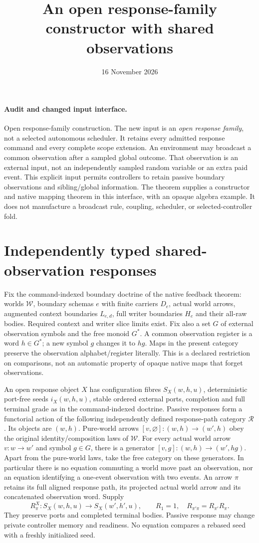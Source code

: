 \documentclass[11pt]{article}
\title{An open response-family constructor with shared observations}
\date{16 November 2026}
\begin{document}
\maketitle
\paragraph{Audit and changed input interface.}
Open response-family construction. The new input is an \emph{open response family}, not a selected autonomous scheduler. It retains every admitted response command and every complete scope extension. An environment may broadcast a common observation after a sampled global outcome. That observation is an external input, not an independently sampled random variable or an extra paid event. This explicit input permits controllers to retain passive boundary observations and sibling/global information. The theorem supplies a constructor and native mapping theorem in this interface, with an opaque algebra example. It does not manufacture a broadcast rule, coupling, scheduler, or selected-controller fold.

\section{Independently typed shared-observation responses}
Fix the command-indexed boundary doctrine of the native feedback theorem: worlds $\mathcal W$, boundary schemas $e$ with finite carriers $D_e$, actual world arrows, augmented context boundaries $L_{e,d}$, full writer boundaries $H_e$ and their all-raw bodies. Required context and writer slice limits exist. Fix also a set $G$ of external observation symbols and the free monoid $G^*$. A common observation register is a word $h\in G^*$; a new symbol $g$ changes it to $hg$. Maps in the present category preserve the observation alphabet/register literally. This is a declared restriction on comparisons, not an automatic property of opaque native maps that forget observations.

An open response object $X$ has configuration fibres $S_X(w,h,u)$, deterministic port-free seeds $i_X(w,h,u)$, stable ordered external ports, completion and full terminal grade as in the command-indexed doctrine. Passive responses form a functorial action of the following independently defined response-path category $\mathcal R$. Its objects are $(w,h)$. Pure-world arrows $[v,\varnothing]:(w,h)\to(w',h)$ obey the original identity/composition laws of $\mathcal W$. For every actual world arrow $v:w\to w'$ and symbol $g\in G$, there is a generator $[v,g]:(w,h)\to(w',hg)$. Apart from the pure-world laws, take the free category on these generators. In particular there is no equation commuting a world move past an observation, nor an equation identifying a one-event observation with two events. An arrow $\pi$ retains its full aligned response path, its projected actual world arrow and its concatenated observation word. Supply
\[
 R^X_\pi:S_X(w,h,u)\longrightarrow S_X(w',h',u),\qquad
 R_1=1,\quad R_{\pi'\pi}=R_{\pi'}R_\pi.               \tag{1}
\]
They preserve ports and completed terminal bodies. Passive response may change private controller memory and readiness. No equation compares a rebased seed with a freshly initialized seed.
\end{document}
